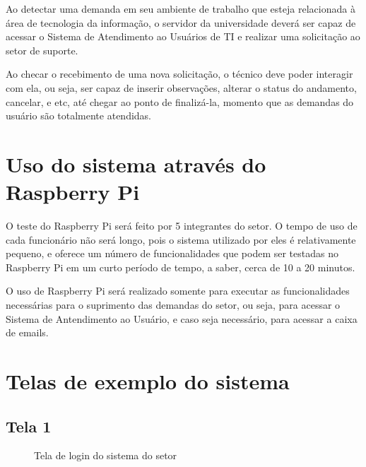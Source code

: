 Ao detectar uma demanda em seu ambiente de trabalho que esteja relacionada à área de tecnologia da informação, o servidor da universidade deverá ser capaz de acessar o Sistema de Atendimento ao Usuários de TI e realizar uma solicitação ao setor de suporte.

Ao checar o recebimento de uma nova solicitação, o técnico deve poder interagir com ela, ou seja, ser capaz de inserir observações, alterar o status do andamento, cancelar, e etc, até chegar ao ponto de finalizá-la, momento que as demandas do usuário são totalmente atendidas.

\section{Uso do sistema através do Raspberry Pi}

O teste do Raspberry Pi será feito por 5 integrantes do setor. O tempo de uso de cada funcionário não será longo, pois o sistema utilizado por eles é relativamente pequeno, e oferece um número de funcionalidades que podem ser testadas no Raspberry Pi em um curto período de tempo, a saber, cerca de 10 a 20 minutos.

O uso de Raspberry Pi será realizado somente para executar as funcionalidades necessárias para o suprimento das demandas do setor, ou seja, para acessar o Sistema de Antendimento ao Usuário, e caso seja necessário, para acessar a caixa de emails.

\newpage

\section{Telas de exemplo do sistema}

\subsection{Tela 1}

\begin{figure}[ht]
    \centering
    \caption{Tela de login do sistema do setor}
\end{figure}

